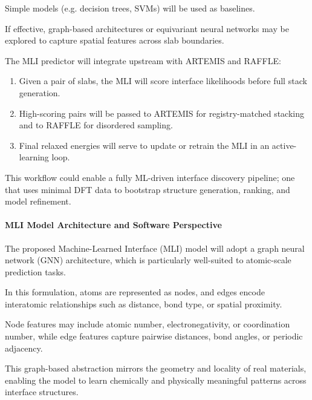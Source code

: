
Simple models (e.g. decision trees, SVMs) will be used as baselines.

If effective, graph-based architectures or equivariant neural networks may be explored to capture spatial features
across slab boundaries.


The MLI predictor will integrate upstream with ARTEMIS and RAFFLE:
\begin{enumerate}
    \item Given a pair of slabs, the MLI will score interface likelihoods before full stack generation.
    \item High-scoring pairs will be passed to ARTEMIS for registry-matched stacking and to RAFFLE for disordered
    sampling.
    \item Final relaxed energies will serve to update or retrain the MLI in an active-learning loop.
\end{enumerate}


This workflow could enable a fully ML-driven interface discovery pipeline; one that uses minimal DFT data to bootstrap
structure generation, ranking, and model refinement.




\paragraph{MLI Model Architecture and Software Perspective}

The proposed Machine-Learned Interface (MLI) model will adopt a graph neural network (GNN) architecture, which is
particularly well-suited to atomic-scale prediction tasks.

In this formulation, atoms are represented as nodes, and edges encode interatomic relationships such as distance, bond
type, or spatial proximity.

Node features may include atomic number, electronegativity, or coordination number, while edge features capture pairwise
distances, bond angles, or periodic adjacency.

This graph-based abstraction mirrors the geometry and locality of real materials, enabling the model to learn chemically
and physically meaningful patterns across interface structures.

